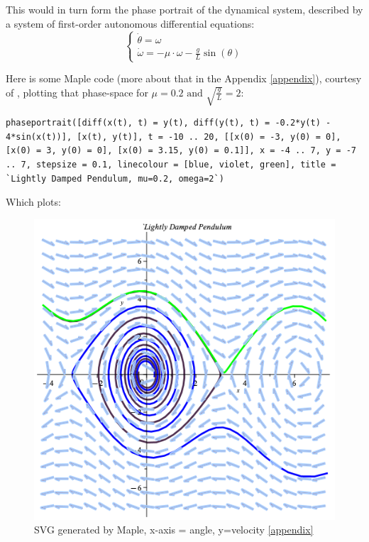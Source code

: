 This would in turn form the phase portrait of the dynamical system, described by a system of first-order autonomous differential equations:
\[
\begin{cases}
	\dot{\theta}  = \omega \\
	\dot{\omega} = -\mu \cdot \omega - \frac{g}{L}\sin(\theta)
\end{cases}
\]

Here is some Maple code (more about that in the Appendix \ref{appendix}), courtesy of   \cite{georgePendulumDemo}, plotting that phase-space for $\mu =0.2 \text{ and } \sqrt{\frac{g}{L}} = 2$:
\begin{verbatim}
phaseportrait([diff(x(t), t) = y(t), diff(y(t), t) = -0.2*y(t) - 4*sin(x(t))], [x(t), y(t)], t = -10 .. 20, [[x(0) = -3, y(0) = 0], [x(0) = 3, y(0) = 0], [x(0) = 3.15, y(0) = 0.1]], x = -4 .. 7, y = -7 .. 7, stepsize = 0.1, linecolour = [blue, violet, green], title = `Lightly Damped Pendulum, mu=0.2, omega=2`)
\end{verbatim}

Which plots:

\begin{figure}[H]
\centering
\includegraphics[width=\textwidth-7cm]{math_pics/damped-pendulum.png}
\caption{SVG generated by Maple, x-axis = angle, y=velocity \ref{appendix}}
\label{fig:damped-pendulum}
\end{figure}

